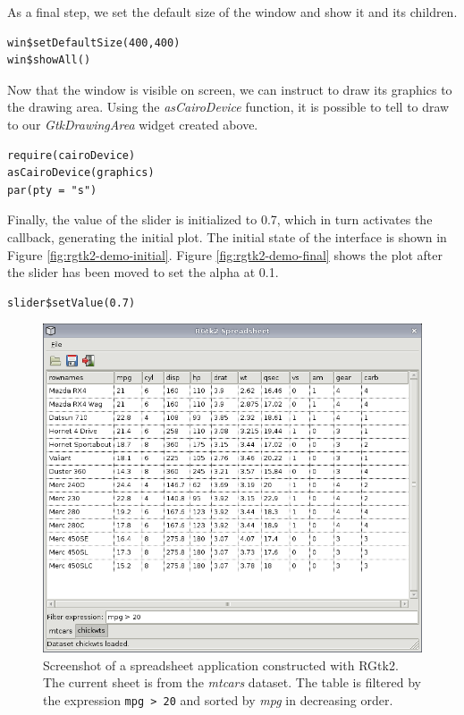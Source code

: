 \documentclass[article]{jss}
\begin{document}
As a final step, we set the default size of the window and show it and its children.
\begin{verbatim}
win$setDefaultSize(400,400)
win$showAll() 
\end{verbatim}

Now that the window is visible on screen, we can instruct  to draw
its graphics to the drawing area. Using the \emph{asCairoDevice} function, it is possible
to tell  to draw to our \emph{GtkDrawingArea} widget created above.
\begin{verbatim}
require(cairoDevice)
asCairoDevice(graphics)
par(pty = "s")
\end{verbatim}

Finally, the value of the slider is initialized to 0.7, which in turn
activates the callback, generating the initial plot. The initial state
of the interface is shown in Figure \ref{fig:rgtk2-demo-initial}.
Figure \ref{fig:rgtk2-demo-final} shows the plot after the slider has been
moved to set the alpha at 0.1.
\begin{verbatim}
slider$setValue(0.7)
\end{verbatim}

\begin{figure}
\begin{center}
\includegraphics[width=6in]{spreadsheet.png}
\caption{\label{fig:spreadsheet}Screenshot of a spreadsheet application 
constructed with RGtk2. The current sheet is from the \emph{mtcars} dataset. The
table is filtered by the expression \texttt{mpg > 20} and sorted by \emph{mpg}
in decreasing order.}
\end{center}
\end{figure}
\end{document}
